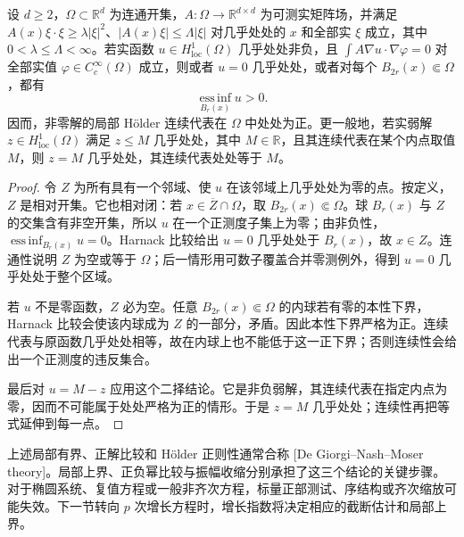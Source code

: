 \begin{corollary}[连通区域中的正性与强最大值原理]
\label{b2:cor:H2-connected-positivity}
设 \(d\geq2\)，\(\Omega\subset\mathbb R^d\) 为连通开集，\(A:\Omega\to\mathbb R^{d\times d}\) 为可测实矩阵场，并满足
\(A(x)\xi\cdot\xi\geq\lambda|\xi|^2\)、\(|A(x)\xi|\leq\Lambda|\xi|\) 对几乎处处的 \(x\) 和全部实 \(\xi\) 成立，其中 \(0<\lambda\leq\Lambda<\infty\)。若实函数 \(u\in H^1_{\mathrm{loc}}(\Omega)\) 几乎处处非负，且
\(\int A\nabla u\cdot\nabla\varphi=0\) 对全部实值 \(\varphi\in C_c^\infty(\Omega)\) 成立，则或者 \(u=0\) 几乎处处，或者对每个 \(B_{2r}(x)\Subset\Omega\)，都有
\[
 \operatorname*{ess\,inf}_{B_r(x)}u>0.
\]
因而，非零解的局部 Hölder 连续代表在 \(\Omega\) 中处处为正。更一般地，若实弱解 \(z\in H^1_{\mathrm{loc}}(\Omega)\) 满足 \(z\leq M\) 几乎处处，其中 \(M\in\mathbb R\)，且其连续代表在某个内点取值 \(M\)，则 \(z=M\) 几乎处处，其连续代表处处等于 \(M\)。
\end{corollary}
\begin{proof}
令 \(Z\) 为所有具有一个邻域、使 \(u\) 在该邻域上几乎处处为零的点。按定义，\(Z\) 是相对开集。它也相对闭：若 \(x\in\overline Z\cap\Omega\)，取 \(B_{2r}(x)\Subset\Omega\)。球 \(B_r(x)\) 与 \(Z\) 的交集含有非空开集，所以 \(u\) 在一个正测度子集上为零；由非负性，\(\operatorname*{ess\,inf}_{B_r(x)}u=0\)。Harnack 比较给出 \(u=0\) 几乎处处于 \(B_r(x)\)，故 \(x\in Z\)。连通性说明 \(Z\) 为空或等于 \(\Omega\)；后一情形用可数子覆盖合并零测例外，得到 \(u=0\) 几乎处处于整个区域。

若 \(u\) 不是零函数，\(Z\) 必为空。任意 \(B_{2r}(x)\Subset\Omega\) 的内球若有零的本性下界，Harnack 比较会使该内球成为 \(Z\) 的一部分，矛盾。因此本性下界严格为正。连续代表与原函数几乎处处相等，故在内球上也不能低于这一正下界；否则连续性会给出一个正测度的违反集合。

最后对 \(u=M-z\) 应用这个二择结论。它是非负弱解，其连续代表在指定内点为零，因而不可能属于处处严格为正的情形。于是 \(z=M\) 几乎处处；连续性再把等式延伸到每一点。
\end{proof}

上述局部有界、正解比较和 Hölder 正则性通常合称 [De Giorgi--Nash--Moser theory]。局部上界、正负幂比较与振幅收缩分别承担了这三个结论的关键步骤。对于椭圆系统、复值方程或一般非齐次方程，标量正部测试、序结构或齐次缩放可能失效。下一节转向 \(p\) 次增长方程时，增长指数将决定相应的截断估计和局部上界。
